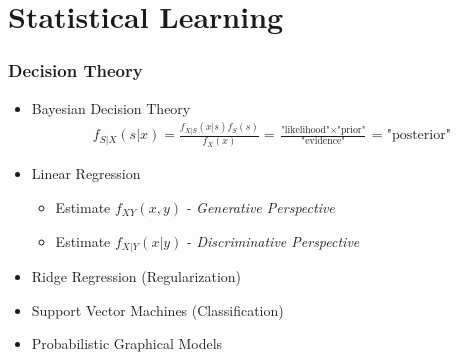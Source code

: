 \section[Statistical Learning]{Statistical Learning}

\begin{frame}
\frametitle{Decision Theory}
\begin{itemize}
\item Bayesian Decision Theory
\begin{align*}
f_{S|X}(s|x)= \frac{f_{X|S}(x|s) f_S(s)}{f_X(x)} = \frac{\text{"likelihood"}\times\text{"prior"}}{\text{"evidence"}} = \text{"posterior"}
\end{align*}

\item Linear Regression
\begin{itemize}
\item Estimate $f_{XY}(x,y)$  - \emph{Generative Perspective}
\item Estimate $f_{X|Y}(x|y)$  - \emph{Discriminative Perspective}
\end{itemize}
\item Ridge Regression (Regularization)
\item Support Vector Machines (Classification)
\item Probabilistic Graphical Models
\begin{align*}
\end{align*}
\end{itemize}
\end{frame}

